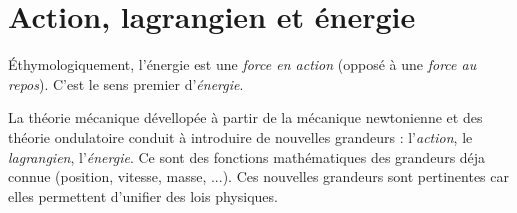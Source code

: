 \section{Action, lagrangien et énergie}
Éthymologiquement, l'énergie est une {\it force en action} (opposé à une {\it force au repos}). C'est le sens premier d'{\it énergie}.

La théorie mécanique dévellopée à partir de la mécanique newtonienne et des théorie ondulatoire conduit à introduire de nouvelles grandeurs : l'{\it action}, le {\it lagrangien}, l'{\it énergie}. Ce sont des fonctions mathématiques des grandeurs déja connue (position, vitesse, masse, ...). Ces nouvelles grandeurs sont pertinentes car elles permettent d'unifier des lois physiques.


